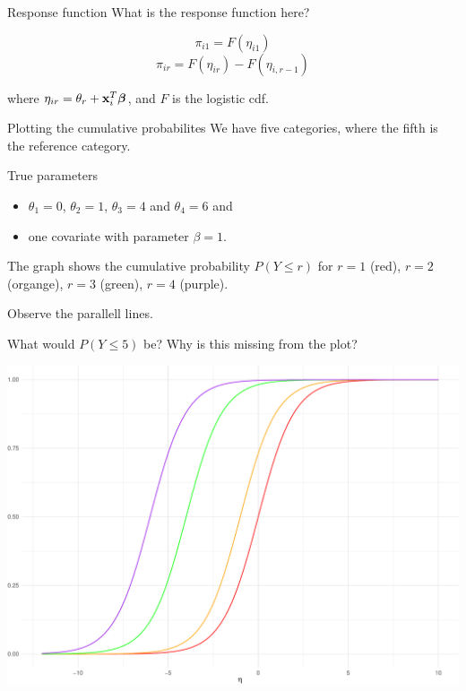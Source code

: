 \documentclass[
  ignorenonframetext,
]{beamer}
\providecommand{\tightlist}{%
  \setlength{\itemsep}{0pt}\setlength{\parskip}{0pt}}
\begin{document}
\begin{frame}
\begin{block}{Response function}
\protect\hypertarget{response-function}{}
What is the response function here?

\[\pi_{i1}=F(\eta_{i1})\] \[\pi_{ir}=F(\eta_{ir})-F(\eta_{i,r-1})\]

where \(\eta_{ir}=\theta_r+{\bf x}_i^T{\boldsymbol \beta}\), and \(F\)
is the logistic cdf.
\end{block}
\end{frame}

\begin{frame}
\begin{block}{Plotting the cumulative probabilites}
\protect\hypertarget{plotting-the-cumulative-probabilites}{}
We have five categories, where the fifth is the reference category.

True parameters

\begin{itemize}
\tightlist
\item
  \(\theta_1=0\), \(\theta_2=1\), \(\theta_3=4\) and \(\theta_4=6\) and
\item
  one covariate with parameter \(\beta=1\).
\end{itemize}

The graph shows the cumulative probability \(P(Y\le r)\) for \(r=1\)
(red), \(r=2\) (organge), \(r=3\) (green), \(r=4\) (purple).

Observe the parallell lines.

What would \(P(Y\le 5)\) be? Why is this missing from the plot?
\end{block}
\end{frame}

\begin{frame}
\includegraphics{Module06MultinomPresentation_files/figure-beamer/unnamed-chunk-9-1.pdf}
\end{frame}
\end{document}
